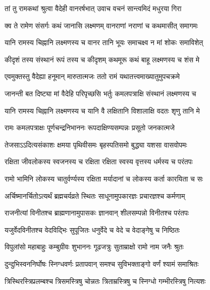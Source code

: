 
\twolineshloka
{तां तु रामकथां श्रुत्वा वैदेही वानरर्षभात्}
{उवाच वचनं सान्त्वमिदं मधुरया गिरा} %

\twolineshloka
{क्व ते रामेण संसर्गः कथं जानासि लक्ष्मणम्}
{वानराणां नराणां च कथमासीत् समागमः} %

\twolineshloka
{यानि रामस्य चिह्नानि लक्ष्मणस्य च वानर}
{तानि भूयः समाचक्ष्व न मां शोकः समाविशेत्} %

\twolineshloka
{कीदृशं तस्य संस्थानं रूपं तस्य च कीदृशम्}
{कथमूरू कथं बाहू लक्ष्मणस्य च शंस मे} %

\twolineshloka
{एवमुक्तस्तु वैदेह्या हनूमान् मारुतात्मजः}
{ततो रामं यथातत्त्वमाख्यातुमुपचक्रमे} %

\twolineshloka
{जानन्ती बत दिष्ट्या मां वैदेहि परिपृच्छसि}
{भर्तुः कमलपत्राक्षि संस्थानं लक्ष्मणस्य च} %

\twolineshloka
{यानि रामस्य चिह्नानि लक्ष्मणस्य च यानि वै}
{लक्षितानि विशालाक्षि वदतः शृणु तानि मे} %

\twolineshloka
{रामः कमलपत्राक्षः पूर्णचन्द्रनिभाननः}
{रूपदाक्षिण्यसम्पन्नः प्रसूतो जनकात्मजे} %

\twolineshloka
{तेजसाऽऽदित्यसंकाशः क्षमया पृथिवीसमः}
{बृहस्पतिसमो बुद्ध्या यशसा वासवोपमः} %

\twolineshloka
{रक्षिता जीवलोकस्य स्वजनस्य च रक्षिता}
{रक्षिता स्वस्य वृत्तस्य धर्मस्य च परंतपः} %

\twolineshloka
{रामो भामिनि लोकस्य चातुर्वर्ण्यस्य रक्षिता}
{मर्यादानां च लोकस्य कर्ता कारयिता च सः} %

\twolineshloka
{अर्चिष्मानर्चितोऽत्यर्थं ब्रह्मचर्यव्रते स्थितः}
{साधूनामुपकारज्ञः प्रचारज्ञश्च कर्मणाम्} %

\twolineshloka
{राजनीत्यां विनीतश्च ब्राह्मणानामुपासकः}
{ज्ञानवान् शीलसम्पन्नो विनीतश्च परंतपः} %

\twolineshloka
{यजुर्वेदविनीतश्च वेदविद्भिः सुपूजितः}
{धनुर्वेदे च वेदे च वेदाङ्गेषु च निष्ठितः} %

\twolineshloka
{विपुलांसो महाबाहुः कम्बुग्रीवः शुभाननः}
{गूढजत्रुः सुताम्राक्षो रामो नाम जनैः श्रुतः} %

\twolineshloka
{दुन्दुभिस्वननिर्घोषः स्निग्धवर्णः प्रतापवान्}
{समश्च सुविभक्ताङ्गो वर्णं श्यामं समाश्रितः} %

\twolineshloka
{त्रिस्थिरस्त्रिप्रलम्बश्च त्रिसमस्त्रिषु चोन्नतः}
{त्रिताम्रस्त्रिषु च स्निग्धो गम्भीरस्त्रिषु नित्यशः} %

